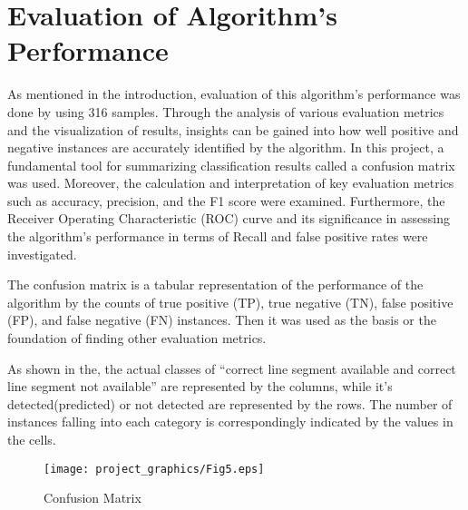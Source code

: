 \documentclass[]{iat}
\begin{document}
\section{Evaluation of Algorithm’s Performance }

As mentioned in the introduction, evaluation of this algorithm's performance was done by using 316 samples. Through the analysis of various evaluation metrics and the visualization of results, insights can be gained into how well positive and negative instances are accurately identified by the algorithm. In this project, a fundamental tool for summarizing classification results called a confusion matrix was used. Moreover, the calculation and interpretation of key evaluation metrics such as accuracy, precision, and the F1 score were examined. Furthermore, the Receiver Operating Characteristic (ROC) curve and its significance in assessing the algorithm's performance in terms of Recall and false positive rates were investigated. 
\par
The confusion matrix is a tabular representation of the performance of the algorithm by the counts of true positive (TP), true negative (TN), false positive (FP), and false negative (FN) instances. Then it was used as the basis or the foundation of finding other evaluation metrics. 
\par
As shown in the, the actual classes of “correct line segment available and correct line segment not available” are represented by the columns, while it’s detected(predicted) or not detected are represented by the rows. The number of instances falling into each category is correspondingly indicated by the values in the cells. 
\par
\FloatBarrier
\begin{figure}[h]
    
	\texttt{[image: project\_graphics/Fig5.eps]}
	\caption{Confusion Matrix}
	\label{fig:fig5}
\end{figure}
\end{document}
